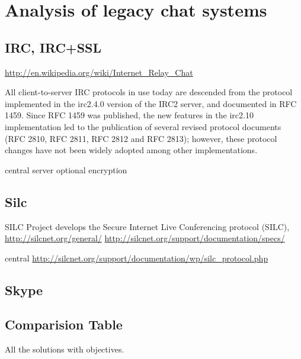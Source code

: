 \section{Analysis of legacy chat systems}

\subsection{IRC, IRC+SSL}
\url{http://en.wikipedia.org/wiki/Internet_Relay_Chat}

All client-to-server IRC protocols in use today are descended from the protocol implemented in the irc2.4.0 version of the IRC2 server, and documented in RFC 1459. Since RFC 1459 was published, the new features in the irc2.10 implementation led to the publication of several revised protocol documents (RFC 2810, RFC 2811, RFC 2812 and RFC 2813); however, these protocol changes have not been widely adopted among other implementations.

central server
optional encryption

\subsection{Silc}
SILC Project develops the Secure Internet Live Conferencing protocol (SILC),
\url{http://silcnet.org/general/}
\url{http://silcnet.org/support/documentation/specs/}

central
\url{http://silcnet.org/support/documentation/wp/silc_protocol.php}


\subsection{Skype}


\subsection{Comparision Table}
All the solutions with objectives.
